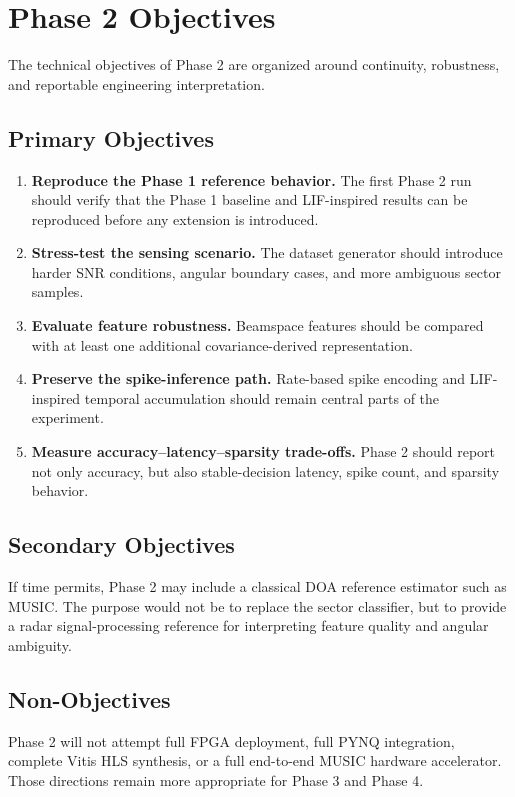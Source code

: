 \section{Phase 2 Objectives}

The technical objectives of Phase 2 are organized around continuity, robustness, and reportable engineering interpretation.

\subsection{Primary Objectives}

\begin{enumerate}
    \item \textbf{Reproduce the Phase 1 reference behavior.} The first Phase 2 run should verify that the Phase 1 baseline and LIF-inspired results can be reproduced before any extension is introduced.
    \item \textbf{Stress-test the sensing scenario.} The dataset generator should introduce harder SNR conditions, angular boundary cases, and more ambiguous sector samples.
    \item \textbf{Evaluate feature robustness.} Beamspace features should be compared with at least one additional covariance-derived representation.
    \item \textbf{Preserve the spike-inference path.} Rate-based spike encoding and LIF-inspired temporal accumulation should remain central parts of the experiment.
    \item \textbf{Measure accuracy--latency--sparsity trade-offs.} Phase 2 should report not only accuracy, but also stable-decision latency, spike count, and sparsity behavior.
\end{enumerate}

\subsection{Secondary Objectives}

If time permits, Phase 2 may include a classical DOA reference estimator such as MUSIC. The purpose would not be to replace the sector classifier, but to provide a radar signal-processing reference for interpreting feature quality and angular ambiguity.

\subsection{Non-Objectives}

Phase 2 will not attempt full FPGA deployment, full PYNQ integration, complete Vitis HLS synthesis, or a full end-to-end MUSIC hardware accelerator. Those directions remain more appropriate for Phase 3 and Phase 4.

